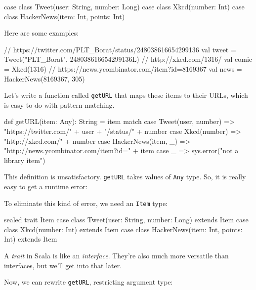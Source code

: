 \documentclass{book}
\begin{document}
\begin{scalacode}
case class Tweet(user: String, number: Long)
case class Xkcd(number: Int)
case class HackerNews(item: Int, points: Int)
\end{scalacode}

Here are some examples:

\begin{scalacode}
// https://twitter.com/PLT_Borat/status/248038616654299136
val tweet = Tweet("PLT_Borat", 248038616654299136L)
// http://xkcd.com/1316/
val comic = Xkcd(1316)
// https://news.ycombinator.com/item?id=8169367
val news = HackerNews(8169367, 305)
\end{scalacode}

Let's write a function called \verb|getURL| that maps these items to their URLs,
which is easy to do with pattern matching.

\begin{scalacode}
def getURL(item: Any): String = item match {
  case Tweet(user, number) => "https://twitter.com/" + user + "/status/" + number
  case Xkcd(number) => "http://xkcd.com/" + number
  case HackerNews(item, _) => "http://news.ycombinator.com/item?id=" + item
  case _ => sys.error("not a library item")
}
\end{scalacode}

This definition is unsatisfactory. \verb|getURL| takes values of \verb|Any|
type. So, it is really easy to get a runtime error:


To eliminate this kind of error, we need an \verb|Item| type:

\begin{scalacode}
sealed trait Item
case class Tweet(user: String, number: Long) extends Item
case class Xkcd(number: Int) extends Item
case class HackerNews(item: Int, points: Int) extends Item
\end{scalacode}

A \emph{trait} in Scala is like an \emph{interface}. They're also much more
versatile than interfaces, but we'll get into that later.

Now, we can rewrite \verb|getURL|, restricting argument type:
\end{document}
